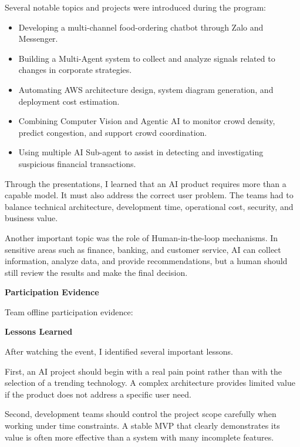 Several notable topics and projects were introduced during the program:

\begin{itemize}
\tightlist
\item
  Developing a multi-channel food-ordering chatbot through Zalo and
  Messenger.
\item
  Building a Multi-Agent system to collect and analyze signals related
  to changes in corporate strategies.
\item
  Automating AWS architecture design, system diagram generation, and
  deployment cost estimation.
\item
  Combining Computer Vision and Agentic AI to monitor crowd density,
  predict congestion, and support crowd coordination.
\item
  Using multiple AI Sub-agent to assist in detecting and investigating
  suspicious financial transactions.
\end{itemize}

Through the presentations, I learned that an AI product requires more
than a capable model. It must also address the correct user problem. The
teams had to balance technical architecture, development time,
operational cost, security, and business value.

Another important topic was the role of Human-in-the-loop mechanisms. In
sensitive areas such as finance, banking, and customer service, AI can
collect information, analyze data, and provide recommendations, but a
human should still review the results and make the final decision.

\vspace{0.5em}\noindent\textbf{Participation Evidence}\par

Team offline participation evidence:

\vspace{0.5em}\noindent\textbf{Lessons Learned}\par

After watching the event, I identified several important lessons.

First, an AI project should begin with a real pain point rather than
with the selection of a trending technology. A complex architecture
provides limited value if the product does not address a specific user
need.

Second, development teams should control the project scope carefully
when working under time constraints. A stable MVP that clearly
demonstrates its value is often more effective than a system with many
incomplete features.

